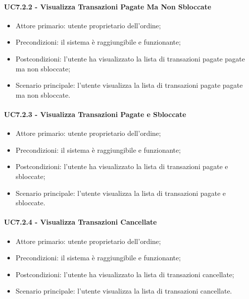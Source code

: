 \paragraph{UC7.2.2 - Visualizza Transazioni Pagate Ma Non Sbloccate}

\begin{itemize}
    \item Attore primario: utente proprietario dell'ordine;
    \item Precondizioni: il sistema è raggiungibile e funzionante;
    \item Postcondizioni: l'utente ha visualizzato la lista di transazioni pagate pagate ma non sbloccate;
    \item Scenario principale: l'utente visualizza la lista di transazioni pagate pagate ma non sbloccate.
\end{itemize}

\paragraph{UC7.2.3 - Visualizza Transazioni Pagate e Sbloccate}

\begin{itemize}
    \item Attore primario: utente proprietario dell'ordine;
    \item Precondizioni: il sistema è raggiungibile e funzionante;
    \item Postcondizioni: l'utente ha visualizzato la lista di transazioni pagate e sbloccate;
    \item Scenario principale: l'utente visualizza la lista di transazioni pagate e sbloccate.
\end{itemize}

\paragraph{UC7.2.4 - Visualizza Transazioni Cancellate}

\begin{itemize}
    \item Attore primario: utente proprietario dell'ordine;
    \item Precondizioni: il sistema è raggiungibile e funzionante;
    \item Postcondizioni: l'utente ha visualizzato la lista di transazioni cancellate;
    \item Scenario principale: l'utente visualizza la lista di transazioni cancellate.
\end{itemize}

